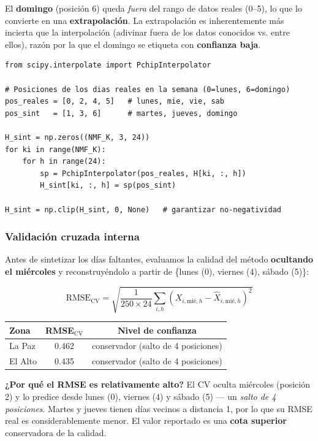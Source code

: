 \documentclass[12pt,a4paper]{article}
\newenvironment{advbox}{%
  \par\addvspace{6pt}%
  \begin{lrbox}{\advboxcontent}%
  \begin{minipage}{\dimexpr\linewidth-16pt}%
  \small\color{naranjaAdv!80!black}%
}{%
  \end{minipage}%
  \end{lrbox}%
  \noindent\colorbox{yellow!12}{\usebox{\advboxcontent}}%
  \par\addvspace{6pt}%
}
\begin{document}
El \textbf{domingo} (posición 6) queda \emph{fuera} del rango de datos
reales (0--5), lo que lo convierte en una \textbf{extrapolación}.
La extrapolación es inherentemente más incierta que la interpolación
(adivinar fuera de los datos conocidos vs. entre ellos),
razón por la que el domingo se etiqueta con \textbf{confianza baja}.

\begin{lstlisting}[caption={Interpolación PCHIP en el eje día-de-semana.}]
from scipy.interpolate import PchipInterpolator

# Posiciones de los dias reales en la semana (0=lunes, 6=domingo)
pos_reales = [0, 2, 4, 5]   # lunes, mie, vie, sab
pos_sint   = [1, 3, 6]      # martes, jueves, domingo

H_sint = np.zeros((NMF_K, 3, 24))
for ki in range(NMF_K):
    for h in range(24):
        sp = PchipInterpolator(pos_reales, H[ki, :, h])
        H_sint[ki, :, h] = sp(pos_sint)

H_sint = np.clip(H_sint, 0, None)   # garantizar no-negatividad
\end{lstlisting}

\subsubsection{Validación cruzada interna}

Antes de sintetizar los días faltantes, evaluamos la calidad del método
\textbf{ocultando el miércoles} y reconstruyéndolo a partir de
\{lunes (0), viernes (4), sábado (5)\}:

\begin{equation}
  \text{RMSE}_{\text{CV}} =
  \sqrt{\frac{1}{250 \times 24}
    \sum_{i,h} \left(X_{i,\text{mié},h} - \hat{X}_{i,\text{mié},h}\right)^2}
\end{equation}

\begin{center}
\begin{tabular}{lcc}
  \toprule
  Zona & RMSE$_{\text{CV}}$ & Nivel de confianza \\
  \midrule
  La Paz  & 0.462 & conservador (salto de 4 posiciones) \\
  El Alto & 0.435 & conservador (salto de 4 posiciones) \\
  \bottomrule
\end{tabular}
\end{center}

\begin{advbox}
  \textbf{¿Por qué el RMSE es relativamente alto?}
  El CV oculta miércoles (posición 2) y lo predice desde lunes (0),
  viernes (4) y sábado (5) — un \emph{salto de 4 posiciones}.
  Martes y jueves tienen días vecinos a distancia 1,
  por lo que su RMSE real es considerablemente menor.
  El valor reportado es una \textbf{cota superior} conservadora de la calidad.
\end{advbox}
\end{document}
